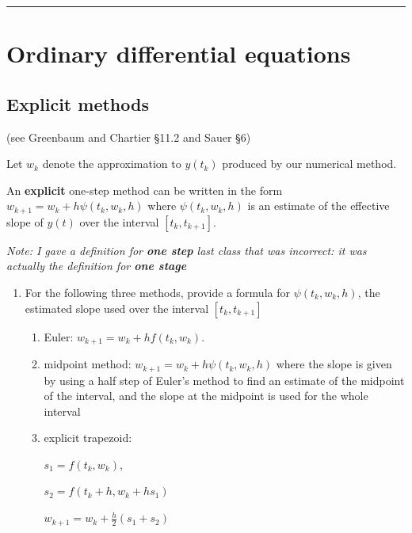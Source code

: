 \documentclass[12pt,letterpaper,noanswers]{exam}
\begin{document}
\vspace{0.2cm}
\hrule
\vspace{0.2cm}


\section*{Ordinary differential equations}
\subsection*{Explicit methods}
 (see Greenbaum and Chartier \S 11.2 and Sauer \S 6)

\begin{tcolorbox}
Let $w_k$ denote the approximation to $y(t_k)$ produced by our numerical method.

An \textbf{explicit} one-step method can be written in the form $w_{k+1} = w_k + h \psi(t_k,w_k,h)$ where $\psi(t_k,w_k,h)$ is an estimate of the effective slope of $y(t)$ over the interval $[t_k,t_{k+1}]$.

\emph{Note: I gave a definition for \textbf{one step} last class that was incorrect: it was actually the definition for \textbf{one stage}}
\end{tcolorbox}


 

\begin{enumerate}
    \item For the following three methods, provide a formula for $\psi(t_k,w_k,h)$, the estimated slope used over the interval $[t_k,t_{k+1}]$
    \begin{enumerate}
    \item Euler: $w_{k+1} = w_k + hf(t_k,w_k)$.
    \vspace{1cm}
    \item midpoint method: $w_{k+1} = w_k + h\psi(t_k,w_k,h)$ where the slope is given by using a half step of Euler's method to find an estimate of the midpoint of the interval, and the slope at the midpoint is used for the whole interval
    \vspace{1.5in}
    \item explicit trapezoid:
    
    $s_1 = f(t_k,w_k)$, 
    
    $s_2 = f(t_k + h, w_k + hs_1)$
    
    $w_{k+1} = w_k + \frac{h}{2}(s_1 + s_2)$
    \vspace{1in}
    \end{enumerate}
\end{enumerate}
\end{document}

